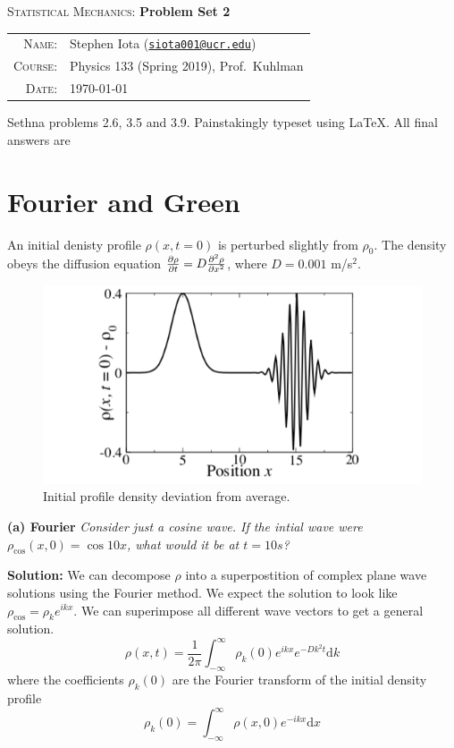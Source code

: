 \documentclass[11pt]{article}
\newcommand{\email}[1]{\texttt{\href{mailto:#1}{#1}}}
\begin{document}
\begin{center}

\Large{\textsc{Statistical Mechanics}: \textbf{Problem Set 2}}
\end{center}
\vspace{.5mm}



\begin{tabular}{rl}
\textsc{Name}:
&
Stephen Iota (\email{siota001@ucr.edu})
\\
\textsc{Course}:
&
Physics 133 (Spring 2019), Prof.~Kuhlman
\\
\textsc{Date}:
&
\today
\end{tabular}
\vspace{2mm}

\noindent
Sethna problems 2.6, 3.5 and 3.9. Painstakingly typeset using \LaTeX. All final answers are 

\section{Fourier and Green}

An initial denisty profile $\rho(x,t=0)$ is perturbed slightly from $\rho_0$. The density obeys the diffusion equation
$\pdv{\rho}{t} = D \pdv[2]{\rho}{x}$,
where $D = 0.001$ m/s$^2$.

\begin{figure}[h!]
\centering
\includegraphics[width=.5\linewidth]{Pset2_Fig1}
\caption{Initial profile density deviation from average.\label{density}}
\end{figure}

\vspace{2mm}
\noindent
\textbf{(a) Fourier}
\textit{Consider just a cosine wave. If the intial wave were
$\rho_\text{cos}(x,0) = \cos{10x}$, what would it be at $t = 10s$?}

\vspace{2mm}
\noindent
\textbf{Solution:}
We can decompose $\rho$ into a superpostition of complex plane wave solutions using the Fourier method. We expect the solution to look like $\rho_\text{cos} = \rho_k e^{ikx}$.
We can superimpose all different wave vectors to get a general solution.
$$
\rho(x,t) = \frac{1}{2\pi} \int_{-\infty}^{\infty} \rho_k(0) e^{ikx} e^{-Dk^2t} \text{d}k
$$
where the coefficients $\rho_k(0)$ are the Fourier transform of the initial density profile
$$
\rho_k(0) = \int_{-\infty}^{\infty} \rho(x,0) e^{-ikx} \text{d}x
$$
\end{document}
